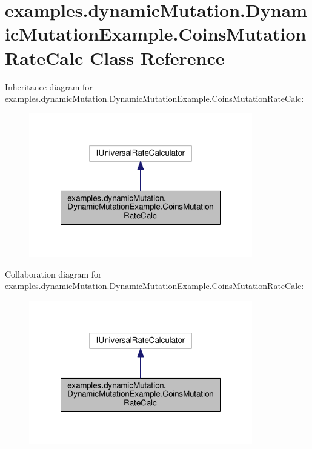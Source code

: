 \hypertarget{classexamples_1_1dynamic_mutation_1_1_dynamic_mutation_example_1_1_coins_mutation_rate_calc}{\section{examples.\-dynamic\-Mutation.\-Dynamic\-Mutation\-Example.\-Coins\-Mutation\-Rate\-Calc Class Reference}
\label{classexamples_1_1dynamic_mutation_1_1_dynamic_mutation_example_1_1_coins_mutation_rate_calc}
}


Inheritance diagram for examples.\-dynamic\-Mutation.\-Dynamic\-Mutation\-Example.\-Coins\-Mutation\-Rate\-Calc\-:
\nopagebreak
\begin{figure}[H]
\begin{center}
\leavevmode
\includegraphics[width=276pt]{classexamples_1_1dynamic_mutation_1_1_dynamic_mutation_example_1_1_coins_mutation_rate_calc__inherit__graph}
\end{center}
\end{figure}


Collaboration diagram for examples.\-dynamic\-Mutation.\-Dynamic\-Mutation\-Example.\-Coins\-Mutation\-Rate\-Calc\-:
\nopagebreak
\begin{figure}[H]
\begin{center}
\leavevmode
\includegraphics[width=276pt]{classexamples_1_1dynamic_mutation_1_1_dynamic_mutation_example_1_1_coins_mutation_rate_calc__coll__graph}
\end{center}
\end{figure}
